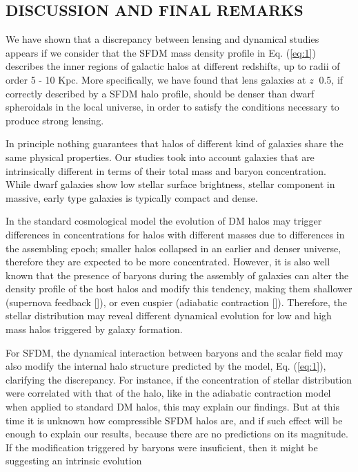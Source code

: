 \documentclass{article}
\begin{document}
\begin{multicols}{2}
\section{DISCUSSION AND FINAL REMARKS}
We have shown that a discrepancy between lensing and
dynamical studies appears if we consider that the SFDM
mass density profile in Eq. (\ref{eq:1}) describes the inner regions
of galactic halos at different redshifts, up to radii of order
5 - 10 Kpc. More specifically, we have found that lens
galaxies at $z~$ 0.5, if correctly described by a SFDM halo
profile, should be denser than dwarf spheroidals in the
local universe, in order to satisfy the conditions necessary
to produce strong lensing.\par
In principle nothing guarantees that halos of different
kind of galaxies share the same physical properties.
Our studies took into account galaxies that are intrinsically
different in terms of their total mass and baryon
concentration. While dwarf galaxies show low stellar surface
brightness, stellar component in massive, early type
galaxies is typically compact and dense.\par
In the standard cosmological model the evolution of
DM halos may trigger differences in concentrations for
halos with different masses due to differences in the assembling
epoch; smaller halos collapsed in an earlier and
denser universe, therefore they are expected to be more
concentrated. However, it is also well known that the
presence of baryons during the assembly of galaxies can
alter the density profile of the host halos and modify
this tendency, making them shallower (supernova feedback
[\cite{23}]), or even cuspier (adiabatic contraction [\cite{24}]).
Therefore, the stellar distribution may reveal different
dynamical evolution for low and high mass halos triggered
by galaxy formation.\par
For SFDM, the dynamical interaction between baryons
and the scalar field may also modify the internal halo
structure predicted by the model, Eq. (\ref{eq:1}), clarifying the
discrepancy. For instance, if the concentration of stellar
distribution were correlated with that of the halo,
like in the adiabatic contraction model when applied to
standard DM halos, this may explain our findings. But
at this time it is unknown how compressible SFDM halos
are, and if such effect will be enough to explain our
results, because there are no predictions on its magnitude.
If the modification triggered by baryons were insuficient, 
then it might be suggesting an intrinsic evolution

\end{multicols}
\end{document}
